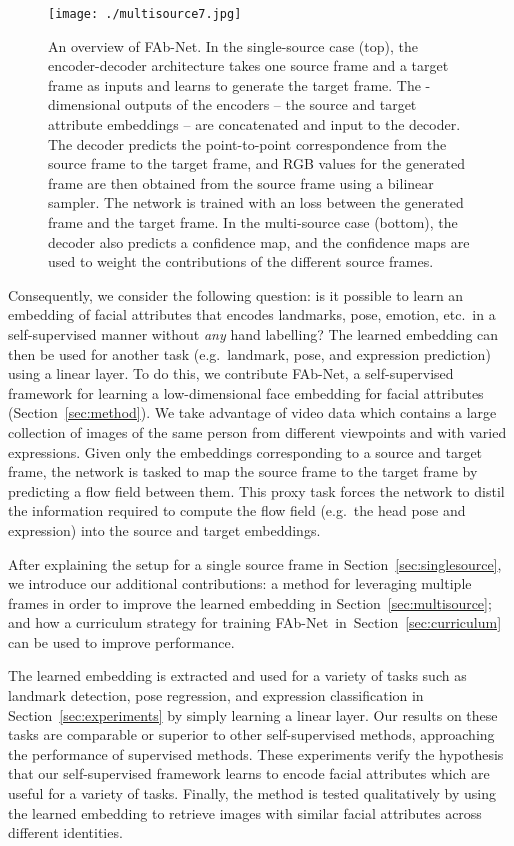 \documentclass{bmvc2k}
\newcommand{\secref}[1]{Section~\ref{#1}}
\def\networkname{FAb-Net}
\begin{document}
\begin{figure}[h!]
\centering
\texttt{[image: ./multisource7.jpg]}

\caption{An overview of \networkname. 
In the single-source case (top), the encoder-decoder architecture
takes one source frame and a target frame as inputs and learns to
generate the target frame. The -dimensional outputs of the
encoders -- the source and target attribute embeddings -- are
concatenated and input to the decoder.  The decoder predicts
the point-to-point correspondence from the source frame to the target frame, and RGB values
for the generated frame are then obtained from the source frame using a bilinear sampler.
The network is
trained with an   loss between the generated frame and the target
frame. In the multi-source case (bottom), the decoder also predicts a
confidence map, and the confidence maps are used to weight  the contributions of the different
source frames.}

\label{fig:overview}
\end{figure}


Consequently, we consider the following question: is it possible to learn an embedding of facial attributes that encodes landmarks, pose, emotion, etc.~in a self-supervised manner without {\em any} hand labelling?
The learned embedding can then be used for another task (e.g.~landmark, pose, and expression prediction) using a linear layer.
To do this, we contribute \networkname, a self-supervised framework for learning a low-dimensional face embedding for facial attributes (\secref{sec:method}).
We take advantage of video data which contains a large collection of images of the same person from different viewpoints and with varied expressions.
Given only the embeddings corresponding to a source and target frame, the
network is tasked  to map  the source frame to the target frame by predicting a flow field between them.
This proxy task forces the network to distil the information required to compute the flow field (e.g.\ the head pose and expression) into the source and target embeddings. 

After explaining the setup for a single source frame in
\secref{sec:singlesource}, we introduce our additional contributions:
a method for
leveraging multiple frames in order to improve the learned embedding
in \secref{sec:multisource};  and how a curriculum strategy for training
\networkname~in~\secref{sec:curriculum} can be used to improve performance.

The learned embedding is extracted and used for a variety of tasks such as landmark detection, pose regression, and expression classification in \secref{sec:experiments} by simply learning a linear layer.
Our results on these tasks are comparable or superior to other self-supervised methods, approaching the performance of supervised methods.
These experiments verify the hypothesis that our self-supervised framework learns to encode facial attributes which are useful for a variety of tasks.
Finally, the method is tested qualitatively by using the learned embedding to retrieve images with similar facial attributes across different identities.
\end{document}
